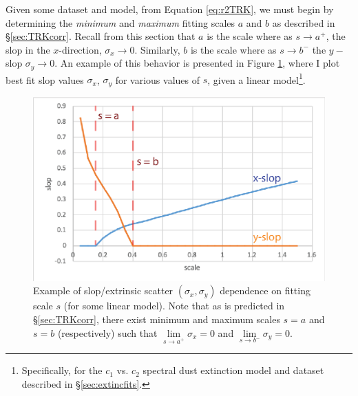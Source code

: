 Given some dataset and model, from Equation \eqref{eq:r2TRK}, we must begin by determining the \textit{minimum} and \textit{maximum} fitting scales $a$ and $b$ as described in \S\ref{sec:TRKcorr}. Recall from this section that $a$ is the scale where as $s\rightarrow a^+$, the slop in the $x$-direction, $\sigma_x\rightarrow 0$. Similarly, $b$ is the scale where as $s\rightarrow b^-$ the $y-$slop $\sigma_y\rightarrow 0$. An example of this behavior is presented in Figure \ref{fig:slopvscale}, where I plot best fit slop values $\sigma_x$, $\sigma_y$ for various values of $s$, given a linear model\footnote{Specifically, for the $c_1$ vs. $c_2$ spectral dust extinction model and dataset described in \S\ref{sec:extincfits}.}.
\begin{figure}
    \centering
    \includegraphics[width=0.8\linewidth]{figures/slopvscale.eps}
    \caption{Example of slop/extrinsic scatter $(\sigma_x,\sigma_y)$ dependence on fitting scale $s$ (for some linear model). Note that as is predicted in \S\ref{sec:TRKcorr}, there exist minimum and maximum scales $s=a$ and $s=b$ (respectively) such that $\lim\limits_{s\rightarrow a^+}\sigma_x = 0$ and $\lim\limits_{s\rightarrow b^-}\sigma_y = 0$.}
    \label{fig:slopvscale}
\end{figure}

